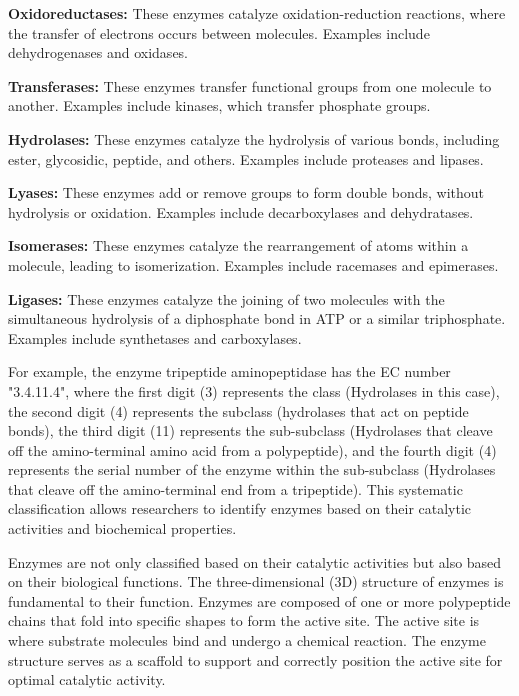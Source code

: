 \begin{compactenum}
    \item \textbf{Oxidoreductases:} These enzymes catalyze oxidation-reduction reactions, where the transfer of electrons occurs between molecules. Examples include dehydrogenases and oxidases.
    
    \item \textbf{Transferases:} These enzymes transfer functional groups from one molecule to another. Examples include kinases, which transfer phosphate groups.
    
    \item \textbf{Hydrolases:} These enzymes catalyze the hydrolysis of various bonds, including ester, glycosidic, peptide, and others. Examples include proteases and lipases.
    
    \item \textbf{Lyases:} These enzymes add or remove groups to form double bonds, without hydrolysis or oxidation. Examples include decarboxylases and dehydratases.
    
    \item \textbf{Isomerases:} These enzymes catalyze the rearrangement of atoms within a molecule, leading to isomerization. Examples include racemases and epimerases.
    
    \item \textbf{Ligases:} These enzymes catalyze the joining of two molecules with the simultaneous hydrolysis of a diphosphate bond in ATP or a similar triphosphate. Examples include synthetases and carboxylases.
    
\end{compactenum}

For example, the enzyme tripeptide aminopeptidase has the EC number "3.4.11.4", where the first digit (3) represents the class (Hydrolases in this case), the second digit (4) represents the subclass (hydrolases that act on peptide bonds), the third digit (11) represents the sub-subclass (Hydrolases that cleave off the amino-terminal amino acid from a polypeptide), and the fourth digit (4) represents the serial number of the enzyme within the sub-subclass (Hydrolases that cleave off the amino-terminal end from a tripeptide). This systematic classification allows researchers to identify enzymes based on their catalytic activities and biochemical properties.

Enzymes are not only classified based on their catalytic activities but also based on their biological functions. The three-dimensional (3D) structure of enzymes is fundamental to their function. Enzymes are composed of one or more polypeptide chains that fold into specific shapes to form the active site. The active site is where substrate molecules bind and undergo a chemical reaction. The enzyme structure serves as a scaffold to support and correctly position the active site for optimal catalytic activity. 

